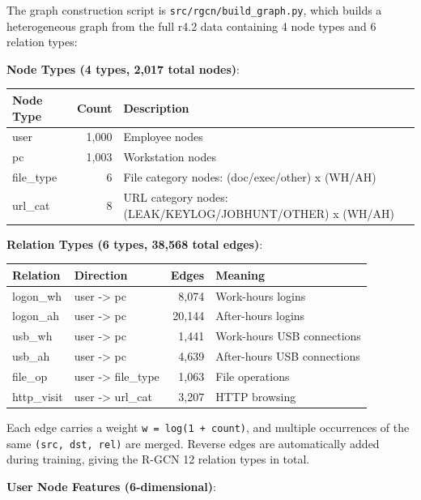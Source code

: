 \documentclass[
  a4paper,
  11pt]{article}
\newcounter{none} %
\begin{document}
The graph construction script is \texttt{src/rgcn/build\_graph.py},
which builds a heterogeneous graph from the full r4.2 data containing 4
node types and 6 relation types:

\textbf{Node Types (4 types, 2,017 total nodes)}:

{\def\LTcaptype{none} %
\begin{longtable}[]{@{}L{0.24}R{0.12}L{0.56}@{}}
\toprule\noalign{}
Node Type & Count & Description \\
\midrule\noalign{}
\endhead
\bottomrule\noalign{}
\endlastfoot
user & 1,000 & Employee nodes \\
pc & 1,003 & Workstation nodes \\
file\_type & 6 & File category nodes: (doc/exec/other) x (WH/AH) \\
url\_cat & 8 & URL category nodes: (LEAK/KEYLOG/JOBHUNT/OTHER) x
(WH/AH) \\
\end{longtable}
}

\textbf{Relation Types (6 types, 38,568 total edges)}:

{\def\LTcaptype{none} %
\begin{longtable}[]{@{}L{0.18}L{0.18}R{0.10}L{0.46}@{}}
\toprule\noalign{}
Relation & Direction & Edges & Meaning \\
\midrule\noalign{}
\endhead
\bottomrule\noalign{}
\endlastfoot
logon\_wh & user -\textgreater{} pc & 8,074 & Work-hours logins \\
logon\_ah & user -\textgreater{} pc & 20,144 & After-hours logins \\
usb\_wh & user -\textgreater{} pc & 1,441 & Work-hours USB
connections \\
usb\_ah & user -\textgreater{} pc & 4,639 & After-hours USB
connections \\
file\_op & user -\textgreater{} file\_type & 1,063 & File operations \\
http\_visit & user -\textgreater{} url\_cat & 3,207 & HTTP browsing \\
\end{longtable}
}

Each edge carries a weight \texttt{w\ =\ log(1\ +\ count)}, and multiple
occurrences of the same \texttt{(src,\ dst,\ rel)} are merged. Reverse
edges are automatically added during training, giving the R-GCN 12
relation types in total.

\textbf{User Node Features (6-dimensional)}:
\end{document}
